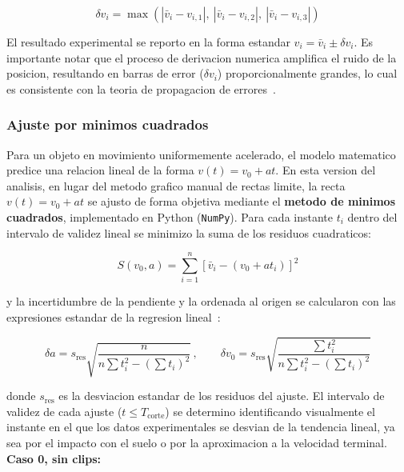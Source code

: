 \begin{equation}
    \delta v_i = \max \left( | \bar{v}_i - v_{i,1} |,\ | \bar{v}_i - v_{i,2} |,\ | \bar{v}_i - v_{i,3} | \right)
\end{equation}

El resultado experimental se reporto en la forma estandar
$v_i = \bar{v}_i \pm \delta v_i$. Es importante notar que el proceso de
derivacion numerica amplifica el ruido de la posicion, resultando en barras
de error ($\delta v_i$) proporcionalmente grandes, lo cual es consistente
con la teoria de propagacion de errores~\cite{taylor1997}.

\subsubsection{Ajuste por minimos cuadrados}

Para un objeto en movimiento uniformemente acelerado, el modelo matematico
predice una relacion lineal de la forma $v(t) = v_0 + at$. En esta version
del analisis, en lugar del metodo grafico manual de rectas limite, la recta
$v(t)=v_0+at$ se ajusto de forma objetiva mediante el \textbf{metodo de
minimos cuadrados}, implementado en Python (\texttt{NumPy}). Para cada
instante $t_i$ dentro del intervalo de validez lineal se minimizo la suma de
los residuos cuadraticos:

\begin{equation}
    S(v_0,a) = \sum_{i=1}^{n}\left[\bar{v}_i - (v_0+at_i)\right]^2
\end{equation}

y la incertidumbre de la pendiente y la ordenada al origen se calcularon con
las expresiones estandar de la regresion lineal~\cite{taylor1997}:

\begin{equation}
    \delta a = s_{\text{res}}\sqrt{\dfrac{n}{n\sum t_i^2-\left(\sum t_i\right)^2}}\, ,
    \qquad
    \delta v_0 = s_{\text{res}}\sqrt{\dfrac{\sum t_i^2}{n\sum t_i^2-\left(\sum t_i\right)^2}}
\end{equation}

donde $s_{\text{res}}$ es la desviacion estandar de los residuos del ajuste.
El intervalo de validez de cada ajuste ($t\le T_{\text{corte}}$) se
determino identificando visualmente el instante en el que los datos
experimentales se desvian de la tendencia lineal, ya sea por el impacto con
el suelo o por la aproximacion a la velocidad terminal.
\\

\textbf{Caso 0, sin clips:}

